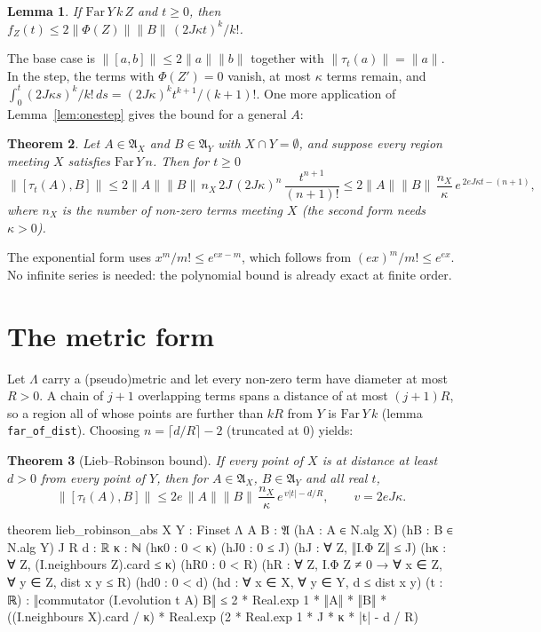 \documentclass[11pt]{article}
\newtheorem{theorem}{Theorem}
\newtheorem{lemma}[theorem]{Lemma}
\theoremstyle{definition}
\theoremstyle{remark}
\newcommand{\fA}{\mathfrak{A}}
\newcommand{\norm}[1]{\|#1\|}
\newcommand{\Far}{\mathrm{Far}}
\begin{document}
\begin{lemma}
If $\Far\,Y\,k\,Z$ and $t\ge0$, then
$f_Z(t)\le2\norm{\Phi(Z)}\norm B\,(2J\kappa t)^k/k!$.
\end{lemma}

The base case is $\norm{[a,b]}\le2\norm a\norm b$ together with $\norm{\tau_t(a)}=\norm{a}$. In the step,
the terms with $\Phi(Z')=0$ vanish, at most $\kappa$ terms remain, and
$\int_0^t(2J\kappa s)^k/k!\,ds=(2J\kappa)^kt^{k+1}/(k+1)!$. One more application of
Lemma~\ref{lem:onestep} gives the bound for a general $A$:

\begin{theorem}
Let $A\in\fA_X$ and $B\in\fA_Y$ with $X\cap Y=\emptyset$, and suppose every region meeting $X$
satisfies $\Far\,Y\,n$. Then for $t\ge0$
\[
  \norm{[\tau_t(A),B]}\le2\norm A\norm B\,n_X\,2J\,(2J\kappa)^n\,\frac{t^{n+1}}{(n+1)!}
  \le2\norm A\norm B\,\frac{n_X}{\kappa}\,e^{\,2eJ\kappa t-(n+1)} ,
\]
where $n_X$ is the number of non-zero terms meeting $X$ (the second form needs $\kappa>0$).
\end{theorem}

The exponential form uses $x^m/m!\le e^{ex-m}$, which follows from $(ex)^m/m!\le e^{ex}$. No
infinite series is needed: the polynomial bound is already exact at finite order.

\section{The metric form}\label{sec:metric}

Let $\Lambda$ carry a (pseudo)metric and let every non-zero term have diameter at most $R>0$. A
chain of $j+1$ overlapping terms spans a distance of at most $(j+1)R$, so a region all of whose
points are further than $kR$ from $Y$ is $\Far\,Y\,k$ (lemma \texttt{far\_of\_dist}). Choosing
$n=\lceil d/R\rceil-2$ (truncated at $0$) yields:

\begin{theorem}[Lieb--Robinson bound]
If every point of $X$ is at distance at least $d>0$ from every point of $Y$, then for
$A\in\fA_X$, $B\in\fA_Y$ and all real $t$,
\[
  \norm{[\tau_t(A),B]}\le 2e\,\norm A\norm B\,\frac{n_X}{\kappa}\,
  e^{\,v|t|-d/R},\qquad v=2eJ\kappa .
\]
\end{theorem}

\begin{lean}
theorem lieb_robinson_abs {X Y : Finset Λ} {A B : 𝔄} (hA : A ∈ N.alg X) (hB : B ∈ N.alg Y)
    {J R d : ℝ} {κ : ℕ} (hκ0 : 0 < κ) (hJ0 : 0 ≤ J) (hJ : ∀ Z, ‖I.Φ Z‖ ≤ J)
    (hκ : ∀ Z, (I.neighbours Z).card ≤ κ) (hR0 : 0 < R)
    (hR : ∀ Z, I.Φ Z ≠ 0 → ∀ x ∈ Z, ∀ y ∈ Z, dist x y ≤ R)
    (hd0 : 0 < d) (hd : ∀ x ∈ X, ∀ y ∈ Y, d ≤ dist x y) (t : ℝ) :
    ‖commutator (I.evolution t A) B‖ ≤
      2 * Real.exp 1 * ‖A‖ * ‖B‖ * ((I.neighbours X).card / κ) *
        Real.exp (2 * Real.exp 1 * J * κ * |t| - d / R)
\end{lean}
\end{document}
